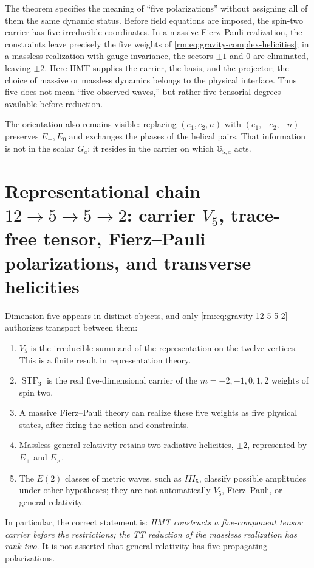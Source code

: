 The theorem specifies the meaning of ``five polarizations'' without assigning all of them the same dynamic status. Before field equations are imposed, the spin-two carrier has five irreducible coordinates. In a massive Fierz--Pauli realization, the constraints leave precisely the five weights of \cref{rm:eq:gravity-complex-helicities}; in a massless realization with gauge invariance, the sectors \(\pm1\) and \(0\) are eliminated, leaving \(\pm2\). Here HMT supplies the carrier, the basis, and the projector; the choice of massive or massless dynamics belongs to the physical interface. Thus five does not mean ``five observed waves,'' but rather five tensorial degrees available before reduction.

The orientation also remains visible: replacing
\((e_1,e_2,n)\) with \((e_1,-e_2,-n)\) preserves \(E_+,E_0\) and exchanges
the phases of the helical pairs. That information is not in the
scalar \(G_a\); it resides in the carrier on which
\(\mathbb G_{5,a}\) acts.

\section{Representational chain \(12\to5\to5\to2\): carrier \(V_5\), trace-free tensor, Fierz–Pauli polarizations, and transverse helicities}

Dimension five appears in distinct objects, and only
\cref{rm:eq:gravity-12-5-5-2} authorizes transport between them:

\begin{enumerate}
\item \(V_5\) is the irreducible summand of the representation on the
twelve vertices. This is a finite result in representation theory.
\item \(\operatorname{STF}_3\) is the real five-dimensional carrier of
the \(m=-2,-1,0,1,2\) weights of spin two.
\item A massive Fierz--Pauli theory can realize these five weights
as five physical states, after fixing the action and constraints.
\item Massless general relativity retains two radiative helicities,
\(\pm2\), represented by \(E_+\) and \(E_\times\).
\item The \(E(2)\) classes of metric waves, such as \(III_5\), classify
possible amplitudes under other hypotheses; they are not automatically
\(V_5\), Fierz--Pauli, or general relativity.
\end{enumerate}

In particular, the correct statement is: \emph{HMT constructs a five-component
tensor carrier before the restrictions; the TT reduction of the massless
realization has rank two}. It is not asserted that
general relativity has five propagating polarizations.
